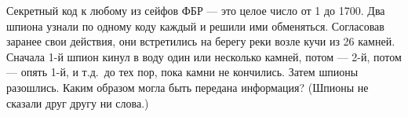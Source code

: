 \documentclass[12pt,a4paper]{article}
\begin{document}











Секретный код к любому из сейфов ФБР --- это целое число от 1
до 1700. Два шпиона узнали по одному коду каждый и решили ими обменяться.
Согласовав заранее свои действия, они встретились на берегу
реки возле кучи из 26 камней. Сначала 1-й шпион кинул в воду один
или несколько камней, потом --- 2-й, потом --- опять 1-й, и т.д.~до
тех пор, пока камни не кончились. Затем шпионы разошлись.
Каким образом могла быть передана информация?
(Шпионы не сказали друг другу ни слова.)
\end{document}
